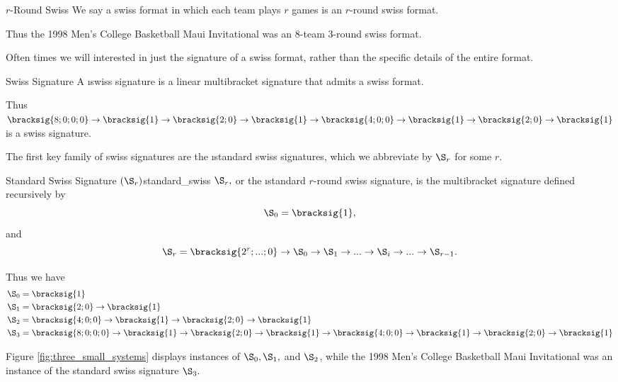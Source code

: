 {    \begin{definition}{$r$-Round Swiss}{}
        We say a swiss format in which each team plays $r$ games is an $r$-round swiss format.
    \end{definition}

    Thus the 1998 Men's College Basketball Maui Invitational was an 8-team 3-round swiss format.

    Often times we will interested in just the signature of a swiss format, rather than the specific details of the entire format.

    \begin{definition}{Swiss Signature}{}
        A \i{swiss signature} is a linear multibracket signature that admits a swiss format.
    \end{definition}

    Thus $\bracksig{8;0;0;0} \to \bracksig{1} \to \bracksig{2;0} \to \bracksig{1} \to \bracksig{4;0;0} \to \bracksig{1} \to \bracksig{2;0} \to \bracksig{1}$ is a swiss signature. 
    


The first key family of swiss signatures are the \i{standard swiss signatures}, which we abbreviate by $\S_r$ for some $r$.

\begin{definition}{Standard Swiss Signature $(\S_r)$}{standard_swiss}
    $\S_r,$ or the \i{standard $r$-round swiss signature}, is the multibracket signature defined recursively by $$\S_0 = \bracksig{1},$$ and
    $$\S_r = \bracksig{2^r; ...; 0} \to \S_{0} \to \S_1 \to ... \to \S_i \to ... \to \S_{r-1}.$$
\end{definition}

Thus we have
\begin{align*}
    \S_0 =\; &\bracksig{1}\\
    \S_1 =\; &\bracksig{2;0} \to \bracksig{1}\\
    \S_2 =\; &\bracksig{4;0;0} \to \bracksig{1} \to \bracksig{2;0} \to \bracksig{1}\\
    \S_3 =\; &\bracksig{8;0;0;0} \to \bracksig{1} \to \bracksig{2;0} \to \bracksig{1} \to \bracksig{4;0;0} \to \bracksig{1} \to \bracksig{2;0} \to \bracksig{1}
\end{align*}

Figure \ref{fig:three_small_systems} displays instances of $\S_0, \S_1,$ and $\S_2$, while the 1998 Men's College Basketball Maui Invitational was an instance of the standard swiss signature $\S_3.$

}
